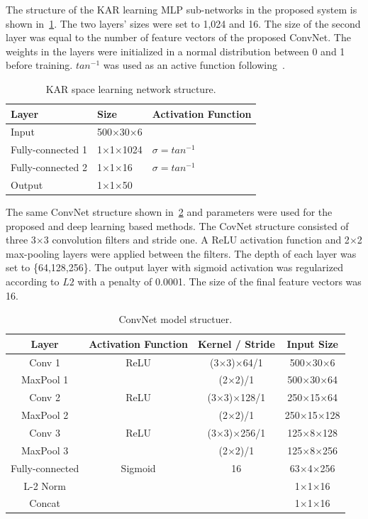 The structure of the KAR learning MLP sub-networks in the proposed system is shown in~\ref{kar_structure}. The two layers' sizes were set to 1,024 and 16. The size of the second layer was equal to the number of feature vectors of the proposed ConvNet. The weights in the layers were initialized in a normal distribution between 0 and 1 before training.
$tan^{-1}$ was used as an active function following~\cite{toh2018analytic}.
\begin{table}[]
    \caption{KAR space learning network structure.}
    \label{kar_structure}
    \centering
    \begin{tabular}{|l|l|l|}
    \hline
    Layer   & Size     & Activation Function \\ \hline
    Input   & 500$\times$30$\times$6 &            \\
    Fully-connected 1 & 1$\times$1$\times$1024 & $\sigma = {tan}^{-1}$     \\
    Fully-connected 2 & 1$\times$1$\times$16  & $\sigma = {tan}^{-1}$     \\
    Output  & 1$\times$1$\times$50   &            \\ \hline
    \end{tabular}
\end{table}
The same ConvNet structure shown in~\ref{conv_structure} and parameters were used for the proposed and deep learning based methods. The CovNet structure consisted of three 3$\times$3 convolution filters and stride one. A ReLU activation function and 2$\times$2 max-pooling layers were applied between the filters. The depth of each layer was set to \{64,128,256\}. The output layer with sigmoid activation was regularized according to $L2$ with a penalty of 0.0001. The size of the final feature vectors was 16.
\begin{table}[]
    \caption{ConvNet model structuer.}
    \label{conv_structure}
    \centering
    \begin{tabular}{|c|c|c|c|}
    \hline
    Layer     & Activation Function & Kernel / Stride & Input Size \\ \hline
    Conv 1    & ReLU       & (3$\times$3)$\times$64/1      & 500$\times$30$\times$6   \\
    MaxPool 1 &            & (2$\times$2)/1         & 500$\times$30$\times$64  \\
    Conv 2    & ReLU       & (3$\times$3)$\times$128/1     & 250$\times$15$\times$64 \\
    MaxPool 2 &            & (2$\times$2)/1         & 250$\times$15$\times$128 \\
    Conv 3    & ReLU       & (3$\times$3)$\times$256/1     & 125$\times$8$\times$128  \\
    MaxPool 3 &            & (2$\times$2)/1         & 125$\times$8$\times$256  \\
    Fully-connected     & Sigmoid    & 16             & 63$\times$4$\times$256   \\
    L-2 Norm  &            &                 & 1$\times$1$\times$16    \\
    Concat    &            &                 & 1$\times$1$\times$16    \\ \hline
    \end{tabular}
\end{table}

